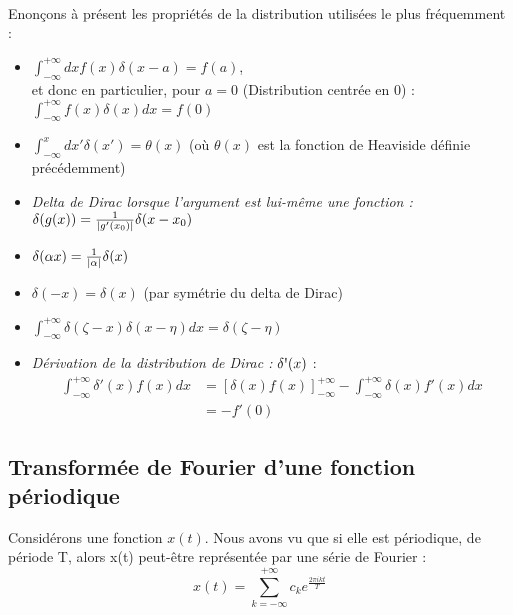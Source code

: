 \documentclass[../notesdecours.tex]{subfiles}
\begin{document}
\paragraph{} Enonçons à présent les propriétés de la distribution utilisées le plus fréquemment :
\begin{itemize}[label = \textbullet]
    \item $\int_{-\infty}^{+\infty} dx f(x)\delta(x-a) = f(a)$, \\
    et donc en particulier, pour $a = 0$ (Distribution centrée en 0) :  $\int_{-\infty}^{+\infty} f(x)\delta(x) dx = f(0)$
    \item $\int_{-\infty}^{x} dx' \delta(x') = \theta(x)$ (où $\theta (x)$ est la fonction de Heaviside définie précédemment)
    \item \textit{Delta de Dirac lorsque l'argument est lui-même une fonction : }$\delta(g(x)) = \frac{1}{\abs{g'(x_0)}}\delta(x-x_0)$ %
    \item $\delta(\alpha x) = \frac{1}{\abs{\alpha}}\delta(x)$
    \item $\delta(-x) = \delta(x)$ (par symétrie du delta de Dirac)
    \item $\int_{-\infty}^{+\infty} \delta(\zeta - x)\delta(x- \eta) dx = \delta (\zeta - \eta)$
    \item \textit{Dérivation de la distribution de Dirac : } $\delta \mbox{\textquotesingle} (x)$ : 
    \begin{align}
        \int^{+\infty}_{-\infty} \delta '(x)f(x) dx &= \left[ \delta(x)f(x) \right]_{-\infty}^{+\infty} - \int_{-\infty}^{+\infty} \delta(x)f'(x) dx \\
    &= -f'(0)
    \end{align}
\end{itemize}

\subsection{Transformée de Fourier d'une fonction périodique}
Considérons une fonction $x(t)$. Nous avons vu que si elle est périodique, de période T, alors x(t) peut-être représentée par une série de Fourier : 
\begin{equation}
\label{serie de Fourier de x}
    x(t) = \sum_{k = -\infty}^{+\infty} c_ke^{\frac{2 \pi i k t}{T}}
\end{equation}
\end{document}
